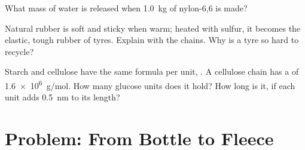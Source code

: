 \begin{exercise}[$\star\star\star$]\label{exo:g12:polymers:13}
What mass of water is released when \qty{1.0}{kg} of nylon-6,6 is made?
\end{exercise}

\begin{exercise}[$\star\star\star$]\label{exo:g12:polymers:14}
Natural rubber is soft and sticky when warm; heated with sulfur, it
becomes the elastic, tough rubber of tyres. Explain with the chains.
Why is a tyre so hard to recycle?
\end{exercise}

\begin{exercise}[$\star\star\star$]\label{exo:g12:polymers:15}
Starch and cellulose have the same formula per unit, . A
cellulose chain has a  of \qty{1.6e6}{g/mol}. How many glucose
units does it hold? How long is it, if each unit adds \qty{0.5}{nm} to
its length?
\end{exercise}

\section{Problem: From Bottle to Fleece}

